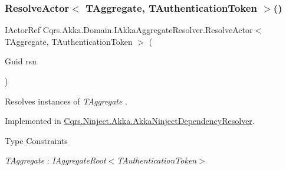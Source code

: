 \subsubsection{\texorpdfstring{Resolve\+Actor$<$ T\+Aggregate, T\+Authentication\+Token $>$()}{ResolveActor< TAggregate, TAuthenticationToken >()}}
{\footnotesize\ttfamily I\+Actor\+Ref Cqrs.\+Akka.\+Domain.\+I\+Akka\+Aggregate\+Resolver.\+Resolve\+Actor$<$ T\+Aggregate, T\+Authentication\+Token $>$ (\begin{DoxyParamCaption}\item[{Guid}]{rsn }\end{DoxyParamCaption})}



Resolves instances of {\itshape T\+Aggregate} . 



Implemented in \hyperlink{classCqrs_1_1Ninject_1_1Akka_1_1AkkaNinjectDependencyResolver_ab5ba20875aab8764bbb7d6df61722436_ab5ba20875aab8764bbb7d6df61722436}{Cqrs.\+Ninject.\+Akka.\+Akka\+Ninject\+Dependency\+Resolver}.

\begin{Desc}
\item[Type Constraints]\begin{description}
\item[{\em T\+Aggregate} : {\em I\+Aggregate\+Root$<$T\+Authentication\+Token$>$}]\end{description}
\end{Desc}

